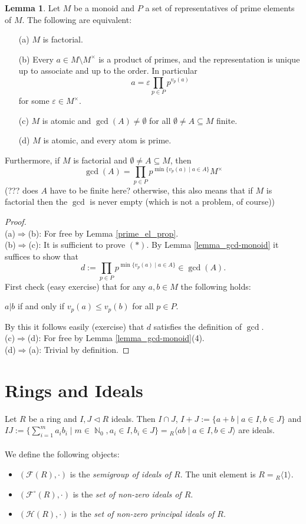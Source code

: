 \documentclass[12pt,a4paper]{report}
\theoremstyle{definition}
\newtheorem{lemma}[theorem]{Lemma}
\theoremstyle{num.custom-title}
\DeclareMathOperator{\N}{\mathbb{N}}
\DeclareMathOperator{\imp}{\Rightarrow}
\DeclareMathOperator{\sm}{\setminus}
\DeclareMathOperator{\sse}{\subseteq}
\newcommand{\F}{\mathcal{F}}
\renewcommand{\epsilon}{\varepsilon}
\renewcommand{\H}{\mathcal{H}}
\begin{document}
\begin{lemma}
Let $M$ be a monoid and $P$ a set of representatives of prime elements of $M$. The following are equivalent:
\begin{enumerate}
\item[(a)] $M$ is factorial.
\item[(b)] Every $a \in M \sm M^\times$ is a product of primes, and the representation is unique up to associate and up to the order. In particular
\[
a = \epsilon \prod_{p \in P} p^{v_p(a)}
\]
for some $\epsilon \in M^\times$.
\item[(c)] $M$ is atomic and $\gcd(A) \neq \emptyset$ for all $\emptyset \neq A \sse M$ finite.
\item[(d)] $M$ is atomic, and every atom is prime.
\end{enumerate}
Furthermore, if $M$ is factorial and $\emptyset \neq A \sse M$, then
\[
\gcd(A) = \prod_{p \in P} p^{\min\{v_p(a) \mid a \in A\}} M^\times \tag{$*$}
\]
(??? does $A$ have to be finite here? otherwise, this also means that if $M$ is factorial then the $\gcd$ is never empty (which is not a problem, of course))
\begin{proof}\ \\
(a)$\imp$(b): For free by Lemma \ref{prime_el_prop}.\\
(b)$\imp$(c): It is sufficient to prove $(*)$. By Lemma \ref{lemma_gcd-monoid} it suffices to show that
\[
d := \prod_{p \in P} p^{\min\{v_p(a) \mid a \in A\}} \in \gcd(A).
\]
First check (easy exercise) that for any $a,b \in M$ the following holds:
\begin{center}
$a|b$ if and only if $v_p(a) \leq v_p(b)$ for all $p \in P$.
\end{center}
By this it follows easily (exercise) that $d$ satisfies the definition of $\gcd$.\\
(c)$\imp$(d): For free by Lemma \ref{lemma_gcd-monoid}(4).\\
(d)$\imp$(a): Trivial by definition.
\end{proof}
\end{lemma}

\section{Rings and Ideals}

Let $R$ be a ring and $I,J \lhd R$ ideals. Then $I \cap J$, $I+J := \{a+b \mid a \in I, b \in J\}$ and $IJ := \{\sum_{i=1}^m a_i b_i \mid m \in \N_0, a_i \in I, b_i \in J\} = {}_R\langle ab \mid a \in I, b \in J \rangle$ are ideals.\\
\\
We define the following objects:
\begin{itemize}
\item $(\F(R), \cdot)$ is the \emph{semigroup of ideals of $R$}. The unit element is $R={}_R\langle 1 \rangle$.
\item $(\F^\circ(R), \cdot)$ is the \emph{set of non-zero ideals of $R$}.
\item $(\H(R), \cdot)$ is the \emph{set of non-zero principal ideals of $R$}.
\end{itemize}
\end{document}

